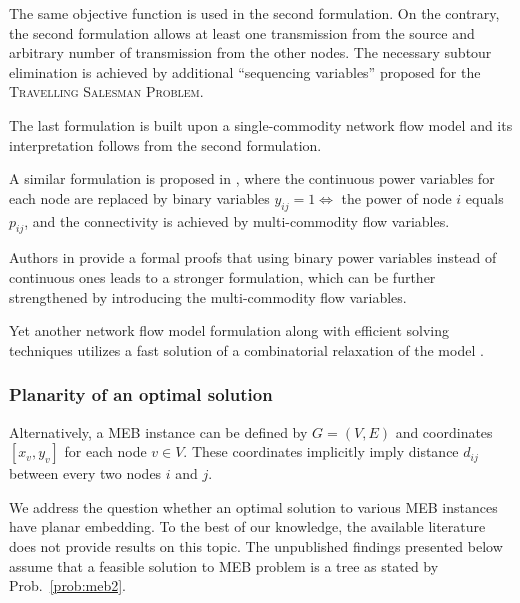 The same objective function is used in the second formulation.
On the contrary, the second formulation allows at least one transmission from the source and arbitrary number of transmission from the other nodes.
The necessary subtour elimination is achieved by additional ``sequencing variables'' proposed for the \textsc{Travelling Salesman Problem}.

The last formulation is built upon a single-commodity network flow model and its interpretation follows from the second formulation.

A similar formulation is proposed in \cite{yuan05}, where the continuous power variables for each node are replaced by binary variables $y_{ij}=1\Leftrightarrow$ the power of node $i$ equals $p_{ij}$,
and the connectivity is achieved by multi-commodity flow variables.

Authors in \cite{haugland11} provide a formal proofs that using binary power variables instead of continuous ones leads to a stronger formulation,
which can be further strengthened by introducing the multi-commodity flow variables.

Yet another network flow model formulation along with efficient solving techniques utilizes a fast solution of a combinatorial relaxation of the model \cite{min06}.

\subsubsection{Planarity of an optimal solution}

Alternatively, a MEB instance can be defined by $G=(V,E)$ and coordinates $\left[x_v,y_v\right]$ for each node $v\in V$.
These coordinates implicitly imply distance $d_{ij}$ between every two nodes $i$ and $j$.

We address the question whether an optimal solution to various MEB instances have planar embedding.
To the best of our knowledge, the available literature does not provide results on this topic.
The unpublished findings presented below assume that a feasible solution to  MEB problem is a tree as stated by Prob.~\ref{prob:meb2}.

